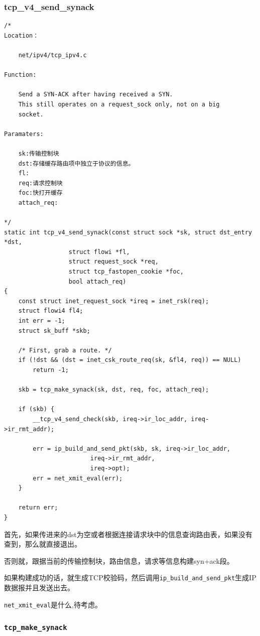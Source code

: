             \subsubsection{tcp\_v4\_send\_synack}
\begin{verbatim}
/*
Location：

	net/ipv4/tcp_ipv4.c

Function: 

    Send a SYN-ACK after having received a SYN.
    This still operates on a request_sock only, not on a big
    socket.

Paramaters:

    sk:传输控制块
    dst:存储缓存路由项中独立于协议的信息。
    fl:
    req:请求控制块
    foc:快打开缓存
    attach_req:

*/
static int tcp_v4_send_synack(const struct sock *sk, struct dst_entry *dst,
                  struct flowi *fl,
                  struct request_sock *req,
                  struct tcp_fastopen_cookie *foc,
                  bool attach_req)
{
    const struct inet_request_sock *ireq = inet_rsk(req);
    struct flowi4 fl4;
    int err = -1;
    struct sk_buff *skb;

    /* First, grab a route. */
    if (!dst && (dst = inet_csk_route_req(sk, &fl4, req)) == NULL)
        return -1;

    skb = tcp_make_synack(sk, dst, req, foc, attach_req);

    if (skb) {
        __tcp_v4_send_check(skb, ireq->ir_loc_addr, ireq->ir_rmt_addr);

        err = ip_build_and_send_pkt(skb, sk, ireq->ir_loc_addr,
                        ireq->ir_rmt_addr,
                        ireq->opt);
        err = net_xmit_eval(err);
    }

    return err;
}
\end{verbatim}                
                首先，如果传进来的dst为空或者根据连接请求块中的信息查询路由表，如果没有查到，那么就直接退出。

                否则就，跟据当前的传输控制块，路由信息，请求等信息构建syn+ack段。

                如果构建成功的话，就生成TCP校验码，然后调用\texttt{ip_build_and_send_pkt}生成IP数据报并且发送出去。

                \texttt{net_xmit_eval}是什么,待考虑。


            \subsubsection{\texttt{tcp_make_synack}}

